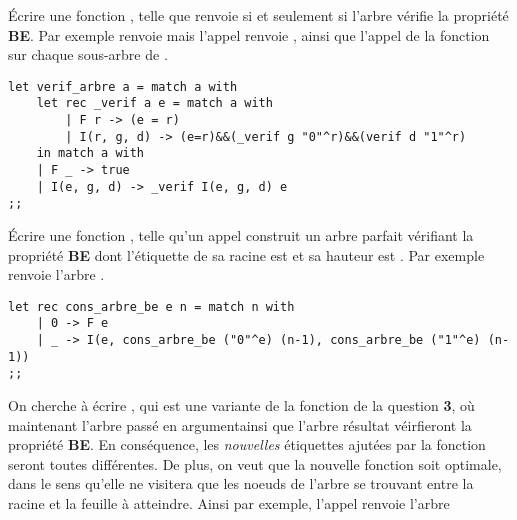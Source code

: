 \documentclass{report}
\begin{document}
\begin{exo}[Arbres]
\begin{q}{4}
\begin{enumerate}
        \end{enumerate}
        \begin{q}{4.1}
            Écrire une fonction , telle que
             renvoie  si et seulement si l'arbre
            vérifie la propriété \textbf{BE}. Par exemple 
            renvoie  mais l'appel  renvoie
            , ainsi que l'appel de la fonction  sur
            chaque sous-arbre de .
            \begin{lstlisting}
let verif_arbre a = match a with
    let rec _verif a e = match a with
        | F r -> (e = r)
        | I(r, g, d) -> (e=r)&&(_verif g "0"^r)&&(verif d "1"^r)
    in match a with
    | F _ -> true
    | I(e, g, d) -> _verif I(e, g, d) e
;;          \end{lstlisting}
        \end{q}
        \begin{q}{4.2}
            Écrire une fonction ,
            telle qu'un appel  construit un arbre parfait
            vérifiant la propriété \textbf{BE} dont l'étiquette de sa racine est
             et sa hauteur est . Par exemple
             renvoie l'arbre .
            \begin{lstlisting}
let rec cons_arbre_be e n = match n with
    | 0 -> F e
    | _ -> I(e, cons_arbre_be ("0"^e) (n-1), cons_arbre_be ("1"^e) (n-1))
;;          \end{lstlisting}
        \end{q}
        \begin{q}{4.3}
            On cherche à écrire 
            , qui est une variante de la fonction  de la question
            \textbf{3}, où maintenant l'arbre passé en argumentainsi que l'arbre résultat
            véirfieront la propriété \textbf{BE}. En conséquence, les \textit{nouvelles}
            étiquettes ajutées par la fonction  seront toutes différentes.
            De plus, on veut que la nouvelle fonction soit optimale, dans le sens qu'elle ne visitera
            que les noeuds de l'arbre se trouvant entre la racine et la feuille à atteindre.
            Ainsi par exemple, l'appel  renvoie l'arbre

\end{q}
\end{q}
\end{exo}
\end{document}

